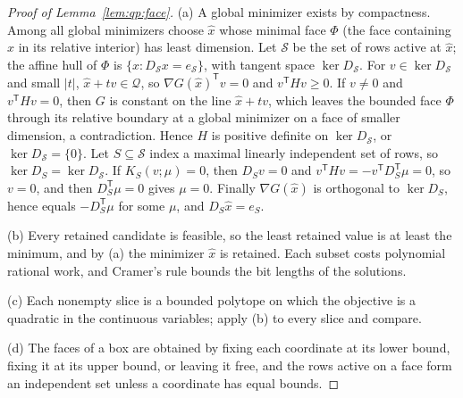 \begin{proof}[Proof of Lemma~\ref{lem:qp:face}]
(a) A global minimizer exists by compactness. Among all global minimizers
choose $\hat x$ whose minimal face $\Phi$ (the face containing $\hat x$ in its
relative interior) has least dimension. Let $\mathcal S$ be the set of rows
active at $\hat x$; the affine hull of $\Phi$ is $\{x:D_{\mathcal S}x=e_{\mathcal S}\}$,
with tangent space $\ker D_{\mathcal S}$. For $v\in\ker D_{\mathcal S}$ and small
$|t|$, $\hat x+tv\in\mathcal Q$, so $\nabla G(\hat x)^{\mathsf T} v=0$ and
$v^{\mathsf T} Hv\ge0$. If $v\ne0$ and $v^{\mathsf T} Hv=0$, then $G$ is constant on the line
$\hat x+tv$, which leaves the bounded face $\Phi$ through its relative
boundary at a global minimizer on a face of smaller dimension, a
contradiction. Hence $H$ is positive definite on $\ker D_{\mathcal S}$, or
$\ker D_{\mathcal S}=\{0\}$. Let $S\subseteq\mathcal S$ index a maximal linearly
independent set of rows, so $\ker D_S=\ker D_{\mathcal S}$. If
$K_S(v;\mu)=0$, then $D_Sv=0$ and $v^{\mathsf T} Hv=-v^{\mathsf T} D_S^{\mathsf T}\mu=0$, so $v=0$,
and then $D_S^{\mathsf T}\mu=0$ gives $\mu=0$. Finally $\nabla G(\hat x)$ is orthogonal
to $\ker D_S$, hence equals $-D_S^{\mathsf T}\mu$ for some $\mu$, and
$D_S\hat x=e_S$.

(b) Every retained candidate is feasible, so the least retained value is at
least the minimum, and by (a) the minimizer $\hat x$ is retained. Each subset
costs polynomial rational work, and Cramer's rule bounds the bit lengths of
the solutions.

(c) Each nonempty slice is a bounded polytope on which the objective is a
quadratic in the continuous variables; apply (b) to every slice and compare.

(d) The faces of a box are obtained by fixing each coordinate at its lower
bound, fixing it at its upper bound, or leaving it free, and the rows active
on a face form an independent set unless a coordinate has equal bounds.
\end{proof}

